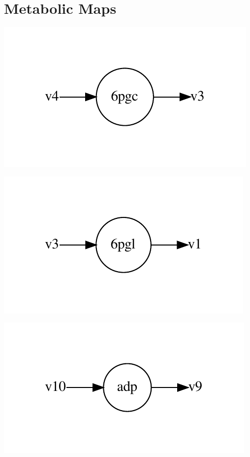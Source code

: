 \documentclass{scrartcl}
\begin{document}
	\section{Metabolic Maps}
			\begin{minipage}{0.33\linewidth}
\includegraphics[max width=\linewidth]{metabolic_maps/6pgc.pdf}
\end{minipage}
\begin{minipage}{0.33\linewidth}
\includegraphics[max width=\linewidth]{metabolic_maps/6pgl.pdf}
\end{minipage}
\begin{minipage}{0.33\linewidth}
\includegraphics[max width=\linewidth]{metabolic_maps/adp.pdf}
\end{minipage}
\end{document}
